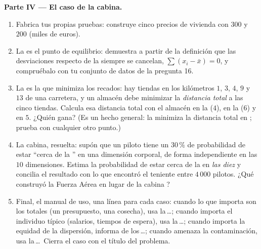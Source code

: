 \begin{problem}
\medskip
\noindent\textbf{Parte IV --- El caso de la cabina.}
\begin{enumerate}[resume]
  \item Fabrica tus propias pruebas: construye cinco precios de vivienda
        con  $300$ y  $200$ (miles de euros).
  \item La  es el punto de equilibrio: demuestra a partir de la
        definición que las desviaciones respecto de la  siempre se
        cancelan, $\sum (x_i - \bar x) = 0$, y compruébalo con tu conjunto
        de datos de la pregunta 16.
  \item La  es la que minimiza los recados: hay tiendas en los
        kilómetros $1$, $3$, $4$, $9$ y $13$ de una carretera, y un
        almacén debe minimizar la \emph{distancia total} a las cinco
        tiendas. Calcula esa distancia total con el almacén en la 
        ($4$), en la  ($6$) y en $5$. ¿Quién gana? (Es un hecho
        general: la  minimiza la distancia total en ;
        prueba con cualquier otro punto.)
  \item La cabina, resuelta: supón que un piloto tiene un $30\,\%$ de
        probabilidad de estar ``cerca de la '' en una dimensión
        corporal, de forma independiente en las $10$ dimensiones. Estima
        la probabilidad de estar cerca de la  en \emph{las diez} y
        concilia el resultado con lo que encontró el teniente entre
        $4\,000$ pilotos. ¿Qué construyó la Fuerza Aérea en lugar de la
        cabina ?
  \item Final, el manual de uso, una línea para cada caso: cuando lo que
        importa son los totales (un presupuesto, una cosecha), usa
        la\,\dots; cuando importa el individuo típico (salarios, tiempos
        de espera), usa la\,\dots; cuando importa la equidad de la
        dispersión, informa de los\,\dots; cuando amenaza la
        contaminación, usa la\,\dots\ Cierra el caso con el título del
        problema.
\end{enumerate}
\end{problem}
